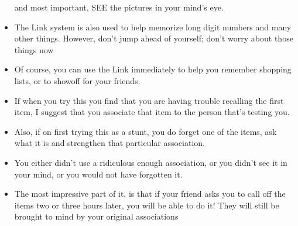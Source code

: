 \begin{itemize}
            and most important, SEE the pictures in your mind's eye.
            \item The Link system is also used
            to help memorize long digit numbers and many other
            things. However, don't jump ahead of yourself; don't
            worry about those things now
            \item Of course, you can use the Link immediately to help
            you remember shopping lists, or to showoff for your friends.
            \item If when you try this you find that you
            are having trouble recalling the first item, I suggest that you
            associate that item to the person that's testing you.
            \item Also, if on first trying
            this as a stunt, you do forget one of the items, ask what it
            is and strengthen that particular association.
            \item You either
            didn't use a ridiculous enough association, or you didn't
            see it in your mind, or you would not have forgotten it.
            \item The most impressive part of it, is that if your friend asks
            you to call off the items two or three hours later, you will
            be able to do it! They will still be brought to mind by
            your original associations
        \end{itemize}

